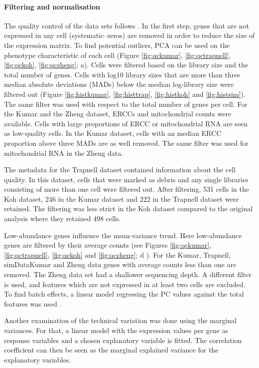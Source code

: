 \documentclass[12pt, a4paper]{article}\usepackage[]{graphicx}\usepackage[]{color}
\begin{document}
\paragraph{Filtering and normalisation}
The quality control of the data sets follows \citet{lun2016step}. In the first step, genes that are not expressed in any cell (systematic--zeros) are removed in order to reduce the size of the expression matrix. To find potential outliers, PCA can be used on the phenotype characteristic of each cell (Figure \ref{fig:qckumar}, \ref{fig:qctrapnell}, \ref{fig:qckoh}, \ref{fig:qczheng}; a). Cells were filtered based on the library size and the total number of genes.
Cells with log10 library sizes that are more than three median absolute deviations (MADs) below the median log-library size were filtered out (Figure \ref{fig:histkumar}, \ref{fig:histtrap}, \ref{fig:histkoh} and \ref{fig:histsim}). The same filter was used with respect to the total number of genes per cell. 
For the Kumar and the Zheng dataset, ERCCs and mitochondrial counts were available. Cells with large proportions of ERCC or mitochondrial RNA are seen as low-quality cells. In the Kumar dataset, cells with an median ERCC proportion above three MADs are as well removed. The same filter was used for mitochondrial RNA in the Zheng data.

The metadata for the Trapnell dataset contained information about the cell quality. In this dataset, cells that were marked as debris and any single libraries consisting of more than one cell were filtered out. After filtering, 531 cells in the Koh dataset, 246 in the Kumar dataset and 222 in the Trapnell dataset were retained. The filtering was less strict in the Koh dataset compared to the original analysis where they retained 498 cells. 

Low-abundance genes influence the mean-variance trend. Here low-abundance genes are filtered by their average counts (see Figures \ref{fig:qckumar}, \ref{fig:qctrapnell}, \ref{fig:qckoh} and \ref{fig:qczheng}; d ). For the Kumar, Trapnell, simDataKumar and Zheng data genes with average counts less than one are removed. The Zheng data set had a shallower sequencing depth. A different filter is used, and features which are not expressed in at least two cells are excluded.
To find batch effects, a linear model regressing the PC values against the total features was used \citep{lun2016step}. 

Another examination of the technical variation was done using the marginal variances\citep{lun2016step}. For that, a linear model with the expression values per gene as response variables and a chosen explanatory variable is fitted. The correlation coefficient can then be seen as the marginal explained variance for the explanatory variables.
\end{document}
